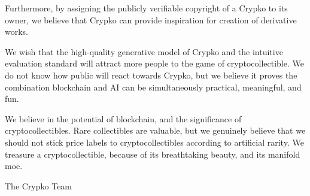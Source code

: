 \documentclass[a4paper]{article}
\begin{document}
Furthermore, by assigning the publicly verifiable copyright of a Crypko to its owner, we believe that Crypko can provide inspiration for creation of derivative works.

We wish that the high-quality generative model of Crypko and the intuitive evaluation standard will attract more people to the game of cryptocollectible. We do not know how public will react towards Crypko, but we believe it proves the combination blockchain and AI can be simultaneously practical, meaningful, and fun.

We believe in the potential of blockchain, and the significance of cryptocollectibles.
Rare collectibles are valuable, but we genuinely believe that we should not stick price labels to cryptocollectibles according to artificial rarity. We treasure a cryptocollectible, because of its breathtaking beauty, and its manifold moe.

\vspace{5mm}

\begin{flushright}
 The Crypko Team
\end{flushright}



\end{document}
